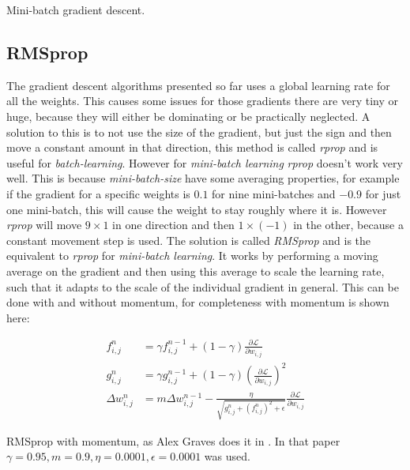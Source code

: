 \begin{algorithm}[h]
 \DontPrintSemicolon
 \caption{Mini-batch gradient descent.}
 \label{algorithm:gradientdescent:mini-batch}
\end{algorithm}

\subsection{RMSprop}

The gradient descent algorithms presented so far uses a global learning rate for all the weights. This causes some issues for those gradients there are very tiny or huge, because they will either be dominating or be practically neglected. A solution to this is to not use the size of the gradient, but just the sign and then move a constant amount in that direction, this method is called \textit{rprop} and is useful for \textit{batch-learning}. However for \textit{mini-batch learning} \textit{rprop} doesn't work very well. This is because \textit{mini-batch-size} have some averaging properties, for example if the gradient for a specific weights is $0.1$ for nine mini-batches and $-0.9$ for just one mini-batch, this will cause the weight to stay roughly where it is. However \textit{rprop} will move $9 \times 1$ in one direction and then $1 \times (-1)$ in the other, because a constant movement step is used. The solution is called \textit{RMSprop} and is the equivalent to \textit{rprop} for \textit{mini-batch learning}. It works by performing a moving average on the gradient and then using this average to scale the learning rate, such that it adapts to the scale of the individual gradient in general. This can be done with and without momentum, for completeness with momentum is shown here:

\begin{equationbox}[H]
\begin{equation*}
\begin{aligned}
f_{i,j}^n &= \gamma f_{i,j}^{n-1} + (1 - \gamma) \frac{\partial \mathcal{L}}{\partial w_{i,j}} \\
g_{i,j}^n &= \gamma g_{i,j}^{n-1} + (1 - \gamma) \left(\frac{\partial \mathcal{L}}{\partial w_{i,j}}\right)^2 \\
\Delta w_{i,j}^n &= m \Delta w_{i,j}^{n-1} - \frac{\eta}{\sqrt{g_{i,j}^n + \left(f_{i,j}^n\right)^2 + \epsilon}} \frac{\partial \mathcal{L}}{\partial w_{i,j}}
\end{aligned}
\end{equation*}
\caption{RMSprop with momentum, as Alex Graves does it in \cite{graves-generating-sequences}. In that paper $\gamma = 0.95, m = 0.9, \eta = 0.0001, \epsilon = 0.0001$ was used.}
\end{equationbox}

